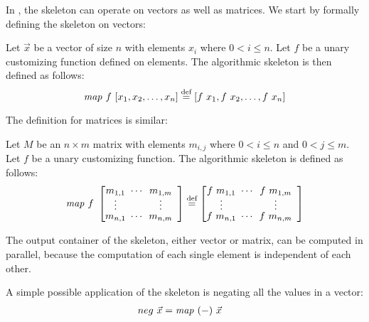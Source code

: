 In \SkelCL, the \map skeleton can operate on vectors as well as matrices.
We start by formally defining the skeleton on vectors:
\begin{definition}
  \label{definition:map}
  Let $\vec{x}$ be a vector of size $n$ with elements $x_i$ where $0 < i \leq n$.
  Let $f$ be a unary customizing function defined on elements.
  The algorithmic skeleton \map is then defined as follows:
  \begin{equation*}
    \map\ f\ [x_1, x_2, \dots, x_n] \eqdef [f\ x_1, f\ x_2, \dots, f\ x_n]
  \end{equation*}
\end{definition}
\noindent
The definition for matrices is similar:
\begin{definition}
  \label{definition:map:matrix}
  Let $M$ be an $n\times m$ matrix with elements $m_{i,j}$ where $0 < i \leq n$ and $0 < j \leq m$.
  Let $f$ be a unary customizing function.
  The algorithmic skeleton \map is defined as follows:
  \begin{equation*}
    \map\ f\ \DottedMatrix{m_{1,1}}{m_{1,m}}{m_{n,1}}{m_{n,m}}
      \eqdef \DottedMatrix{f\ m_{1,1}}{f\ m_{1,m}}{f\ m_{n,1}}{f\ m_{n,m}}
  \end{equation*}
\end{definition}
\noindent
The output container of the \map skeleton, either vector or matrix, can be computed in parallel, because the computation of each single element is independent of each other.

A simple possible application of the \map skeleton is negating all the values in a vector:
\begin{align*}
  neg\ \vec{x} &= \text{\textit{map}}\ (-)\ \vec{x}
\end{align*}


